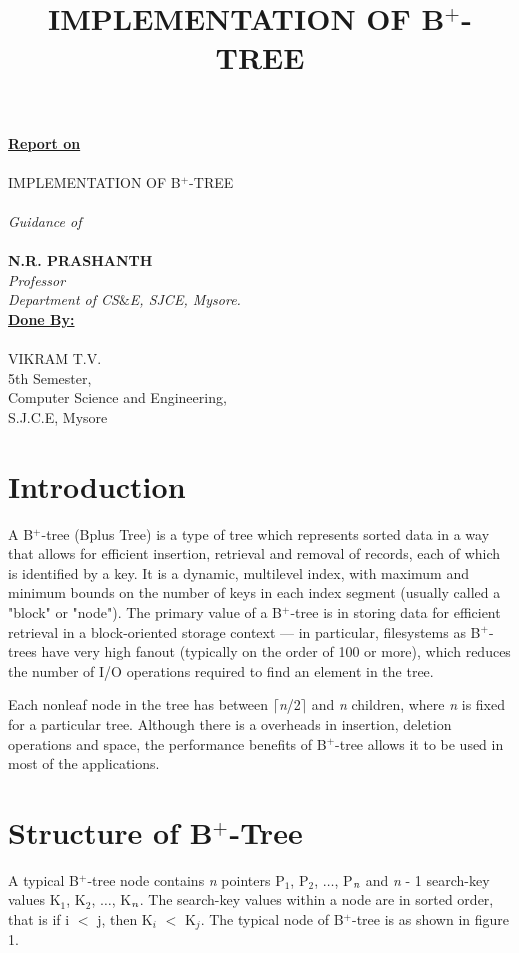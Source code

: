 \documentclass[11pt, oneside, a4paper]{article}
\begin{document}
\begin{center}
\textbf{\underline{Report on}}\\
\textsc{\\IMPLEMENTATION OF B$^+$-TREE\\}
\emph{\\Guidance of}\\
\textbf{\\N.R. PRASHANTH}\\
\textit{Professor}\\
\textit{Department of CS$\&$E, SJCE, Mysore.}\\
\vspace{1in}
\textbf{\underline{Done By:}}\\
\textsc{\\VIKRAM T.V.}\\
5th Semester,\\ Computer Science and Engineering,\\
S.J.C.E, Mysore\\
\title {IMPLEMENTATION OF B$^+$-TREE\\}
\end{center}
\newpage
\thispagestyle{empty}
\tableofcontents
\newpage
{}

\twocolumn
\section{Introduction}
A B$^+$-tree (Bplus Tree) is a type of tree which represents sorted data in a way that allows for efficient insertion, retrieval and removal of records, each of which is identified by a key. It is a dynamic, multilevel index, with maximum and minimum bounds on the number of keys in each index segment (usually called a "block" or "node").  The primary value of a B$^+$-tree is in storing data for efficient retrieval in a block-oriented storage context — in particular, filesystems as B$^+$-trees have very high fanout (typically on the order of 100 or more), which reduces the number of I/O operations required to find an element in the tree.

Each nonleaf node in the tree has between $\lceil$\emph{n}/2$\rceil$ and \emph{n} children, where \emph{n} is fixed for a particular tree.  Although there is a overheads in insertion, deletion operations and space, the performance benefits of B$^+$-tree allows it to be used in most of the applications.

\section{Structure of B$^+$-Tree}
A typical B$^+$-tree node contains \emph{n} pointers P$_1$, P$_2$, $\ldots$, P$_\emph{n}$ and \emph{n} - 1 search-key values K$_1$, K$_2$, $\ldots$, K$_\emph{n}$.  The search-key values within a node are in sorted order, that is if i $<$ j, then K$_i$ $<$ K$_j$.  The typical node of B$^+$-tree is as shown in figure 1.
\end{document}
